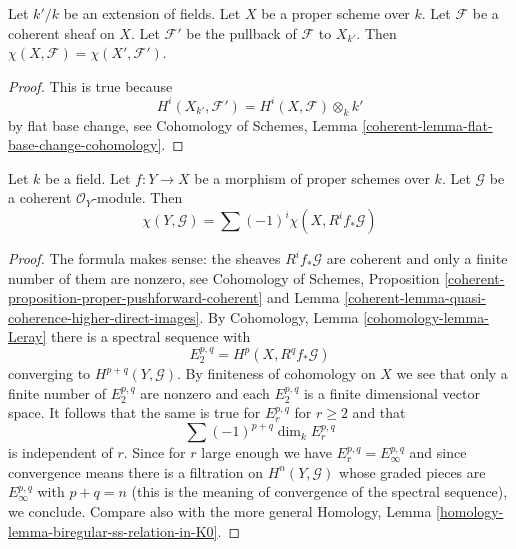 \begin{lemma}
\label{lemma-euler-characteristic-extend-base-field}
Let $k'/k$ be an extension of fields. Let $X$ be a proper scheme
over $k$. Let $\mathcal{F}$ be a coherent sheaf on $X$.
Let $\mathcal{F}'$ be the pullback of $\mathcal{F}$ to $X_{k'}$.
Then $\chi(X, \mathcal{F}) = \chi(X', \mathcal{F}')$.
\end{lemma}

\begin{proof}
This is true because
$$
H^i(X_{k'}, \mathcal{F}') = H^i(X, \mathcal{F}) \otimes_k k'
$$
by flat base change, see
Cohomology of Schemes, Lemma \ref{coherent-lemma-flat-base-change-cohomology}.
\end{proof}

\begin{lemma}
\label{lemma-euler-characteristic-morphism}
Let $k$ be a field. Let $f : Y \to X$ be a morphism of proper schemes over
$k$. Let $\mathcal{G}$ be a coherent $\mathcal{O}_Y$-module. Then
$$
\chi(Y, \mathcal{G}) = \sum (-1)^i \chi(X, R^if_*\mathcal{G})
$$
\end{lemma}

\begin{proof}
The formula makes sense: the sheaves $R^if_*\mathcal{G}$ are coherent
and only a finite number of them are nonzero, see
Cohomology of Schemes,
Proposition \ref{coherent-proposition-proper-pushforward-coherent} and
Lemma \ref{coherent-lemma-quasi-coherence-higher-direct-images}.
By Cohomology, Lemma \ref{cohomology-lemma-Leray} there is a spectral
sequence with
$$
E_2^{p, q} = H^p(X, R^qf_*\mathcal{G})
$$
converging to $H^{p + q}(Y, \mathcal{G})$. By finiteness of cohomology
on $X$ we see that only a finite number of $E_2^{p, q}$ are nonzero
and each $E_2^{p, q}$ is a finite dimensional vector space. It follows
that the same is true for $E_r^{p, q}$ for $r \geq 2$ and that
$$
\sum (-1)^{p + q} \dim_k E_r^{p, q}
$$
is independent of $r$. Since for $r$ large enough we have
$E_r^{p, q} = E_\infty^{p, q}$ and since convergence means there
is a filtration on $H^n(Y, \mathcal{G})$ whose graded pieces are
$E_\infty^{p, q}$ with $p + q = n$ (this is the meaning of convergence
of the spectral sequence), we conclude.
Compare also with the more general
Homology, Lemma \ref{homology-lemma-biregular-ss-relation-in-K0}.
\end{proof}








